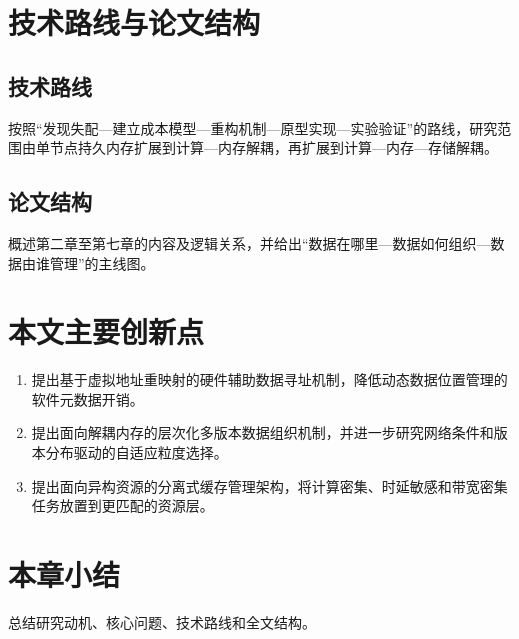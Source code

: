 \section{技术路线与论文结构}
\subsection{技术路线}
按照“发现失配—建立成本模型—重构机制—原型实现—实验验证”的路线，研究范围由单节点持久内存扩展到计算—内存解耦，再扩展到计算—内存—存储解耦。
\subsection{论文结构}
概述第二章至第七章的内容及逻辑关系，并给出“数据在哪里—数据如何组织—数据由谁管理”的主线图。

\section{本文主要创新点}
\begin{enumerate}
  \item 提出基于虚拟地址重映射的硬件辅助数据寻址机制，降低动态数据位置管理的软件元数据开销。
  \item 提出面向解耦内存的层次化多版本数据组织机制，并进一步研究网络条件和版本分布驱动的自适应粒度选择。
  \item 提出面向异构资源的分离式缓存管理架构，将计算密集、时延敏感和带宽密集任务放置到更匹配的资源层。
\end{enumerate}

\section{本章小结}
总结研究动机、核心问题、技术路线和全文结构。

